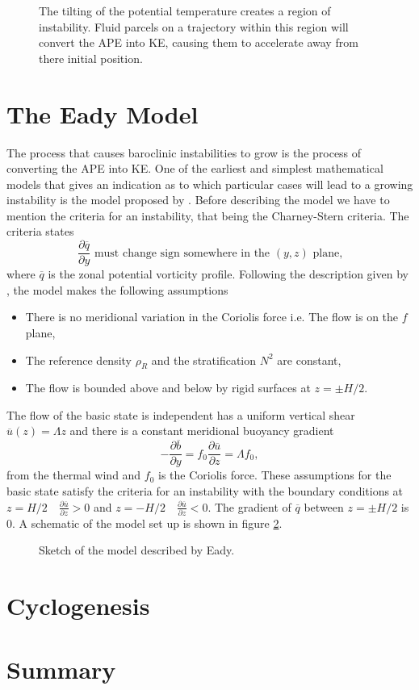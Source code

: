\documentclass{article}
\begin{document}
\begin{figure}[hb]
  \centering
  
  \caption{The tilting of the potential temperature creates a region of instability. Fluid parcels on a trajectory within this region will convert the APE into KE, causing them to accelerate away from there initial position. }
  \label{pedloskyexample}
\end{figure}

\section{The Eady Model}
The process that causes baroclinic instabilities to grow is the process of converting the APE into KE. One of the earliest and simplest mathematical models that gives an indication as to which particular cases will lead to a growing instability is the model proposed by \cite{Eady1949}. Before describing the model we have to mention the criteria for an instability, that being the Charney-Stern criteria. The criteria states 
$$\frac{\partial\overline{q}}{\partial y}\text{ must change sign somewhere in the }(y,z)\text{ plane,} $$
where $\overline{q}$ is the zonal potential vorticity profile. 
Following the description given by \cite{Hoskins2013}, the model makes the following assumptions
\begin{itemize}
  \item There is no meridional variation in the Coriolis force i.e. The flow is on the $f$ plane,
  \item The reference density $\rho_R$ and the stratification $N^2$ are constant,
  \item The flow is bounded above and below by rigid surfaces at $z=\pm H/2$. 
\end{itemize}
The flow of the basic state is independent has a uniform vertical shear $\overline{u}(z) = \Lambda z$ and there is a constant meridional buoyancy gradient 
$$-\frac{\partial\overline{b}}{\partial y} = f_0\frac{\partial\overline{u}}{\partial z}= \Lambda f_0,$$
from the thermal wind and $f_0$ is the Coriolis force. These assumptions for the basic state satisfy the criteria for an instability with the boundary conditions at $\displaystyle z= H/2 \quad \frac{\partial\overline u}{\partial z} > 0$ and $\displaystyle z= -H/2 \quad \frac{\partial\overline u}{\partial z} < 0$. The gradient of $\overline{q}$ between $z=\pm H/2$ is 0. A schematic of the model set up is shown in figure \ref{eadyexample}.
\begin{figure}[hb]
  \centering
  
  \caption{Sketch of the model described by Eady.}
  \label{eadyexample}
\end{figure}
\section{Cyclogenesis} 

\section{Summary}


\end{document}
